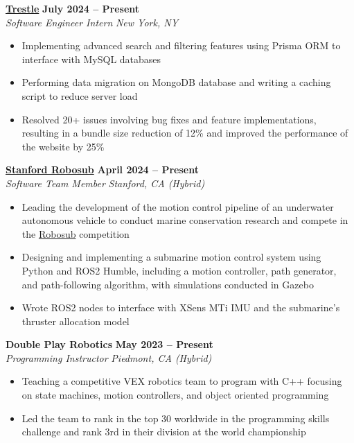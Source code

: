 \documentclass[11pt]{article}       %
\begin{document}
\textbf{\href{https://www.gotrestle.com}{Trestle}} \hfill \textbf{July 2024 -- Present} \\
\emph{Software Engineer Intern} \hfill \emph{New York, NY}
\vspace{-8pt}
\begin{itemize}
  \item Implementing advanced search and filtering features using Prisma ORM to interface with MySQL databases 
  \item Performing data migration on MongoDB database and writing a caching script to reduce server load
  \item Resolved 20+ issues involving bug fixes and feature implementations, resulting in a bundle size reduction of 12\% and improved the performance of the website by 25\%
\end{itemize}

\textbf{\href{https://www.stanfordrobosub.org}{Stanford Robosub}} \hfill \textbf{April 2024 -- Present} \\
\emph{Software Team Member} \hfill \emph{Stanford, CA (Hybrid)} \\
\vspace{-8pt}
\begin{itemize}
    \item Leading the development of the motion control pipeline of an underwater autonomous vehicle to conduct marine conservation research and compete in the \href{https://robosub.org}{Robosub} competition
    \item Designing and implementing a submarine motion control system using Python and ROS2 Humble, including a motion controller, path generator, and path-following algorithm, with simulations conducted in Gazebo
    \item Wrote ROS2 nodes to interface with XSens MTi IMU and the submarine's thruster allocation model
\end{itemize}

\textbf{Double Play Robotics} \hfill \textbf{May 2023 -- Present} \\
\emph{Programming Instructor} \hfill \emph{Piedmont, CA (Hybrid)}
\vspace{-8pt}
\begin{itemize}
  \item Teaching a competitive VEX robotics team to program with C++ focusing on state machines, motion controllers, and object oriented programming
  \item Led the team to rank in the top 30 worldwide in the  programming skills challenge and rank 3rd in their division at the world championship
\end{itemize}
\end{document}
